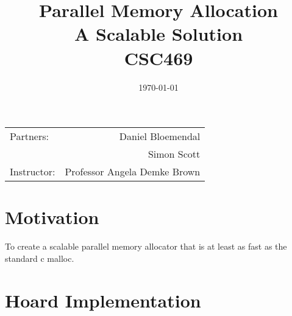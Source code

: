 \documentclass[11pt]{article}
\title{Parallel Memory Allocation \\ A Scalable Solution \\ CSC469} %
\date{\today} %
\begin{document}
\maketitle %

\begin{center}
\begin{tabular}{l r}
Partners: & Daniel Bloemendal \\ %
& Simon Scott \\
Instructor: & Professor Angela Demke Brown %
\end{tabular}
\end{center}



\section{Motivation}

\indent \indent To create a scalable parallel memory allocator that is at least as fast as the standard c malloc.


\section{Hoard Implementation}
\end{document}
